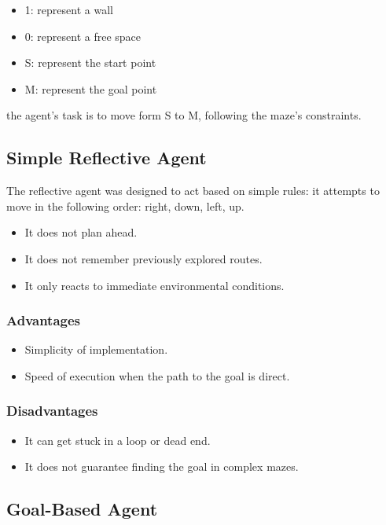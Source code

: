 \documentclass[letterpaper,12pt,oneside]{article}
\begin{document}
\begin{itemize}
    \item 1: represent a wall
    \item 0: represent a free space
    \item S: represent the start point
    \item M: represent the goal point
\end{itemize}

the agent's task is to move form S to M, following the maze's constraints.

\subsection{Simple Reflective Agent}

The reflective agent was designed to act based on simple rules: it attempts to move in the following order: right, down, left, up.

\begin{itemize}
    \item It does not plan ahead.
    \item It does not remember previously explored routes.
    \item It only reacts to immediate environmental conditions.
\end{itemize}

\subsubsection{Advantages}

\begin{itemize}
    \item Simplicity of implementation.
    \item Speed of execution when the path to the goal is direct.
\end{itemize}

\subsubsection{Disadvantages}

\begin{itemize}
    \item It can get stuck in a loop or dead end.
    \item It does not guarantee finding the goal in complex mazes.
\end{itemize}

\subsection{Goal-Based Agent}
\end{document}
